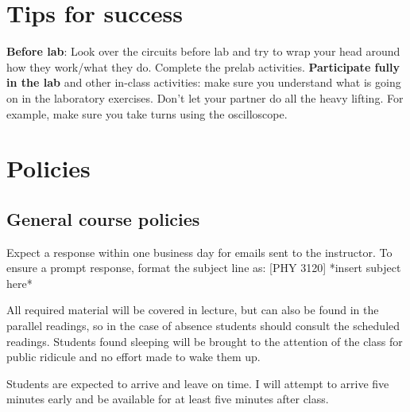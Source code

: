 \documentclass{syllabus}
\begin{document}

\section*{Tips for success}
\textbf{Before lab}: Look over the circuits before lab and try to wrap your head around how they work/what they do. Complete the prelab activities. 
\textbf{Participate fully in the lab} and other in-class activities: make sure you understand what is going on in the laboratory exercises. Don’t let your partner do all the heavy lifting. For example, make sure you take turns using the oscilloscope.



\section*{Policies}
\subsection{General course policies}
Expect a response within one business day for emails sent to the instructor. To ensure a prompt response, format the subject line as: [PHY 3120] *insert subject here*

All required material will be covered in lecture, but can also be found in the parallel readings, so in the case of absence students should consult the scheduled readings. Students found sleeping will be brought to the attention of the class for public ridicule and no effort made to wake them up.

Students are expected to arrive and leave on time. I will attempt to arrive five minutes early and be available for at least five minutes after class.

\collegepolicies
\end{document}
